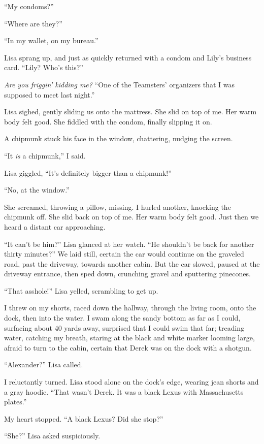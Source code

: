 ``My condoms?''

``Where are they?''

``In my wallet, on my bureau.''

Lisa sprang up, and just as quickly returned with a condom and Lily's
business card. ``Lily? Who's this?''

\emph{Are you friggin' kidding me?} ``One of the Teamsters' organizers
that I was supposed to meet last night.''

Lisa sighed, gently sliding us onto the mattress. She slid on top of me.
Her warm body felt good. She fiddled with the condom, finally slipping
it on.

A chipmunk stuck his face in the window, chattering, nudging the screen.

``It \emph{is} a chipmunk,'' I said.

Lisa giggled, ``It's definitely bigger than a chipmunk!''

``No, at the window.''

She screamed, throwing a pillow, missing. I hurled another, knocking the
chipmunk off. She slid back on top of me. Her warm body felt good. Just
then we heard a distant car approaching.

``It can't be him?'' Lisa glanced at her watch. ``He shouldn't be back
for another thirty minutes?'' We laid still, certain the car would
continue on the graveled road, past the driveway, towards another cabin.
But the car slowed, paused at the driveway entrance, then sped down,
crunching gravel and sputtering pinecones.

``That asshole!'' Lisa yelled, scrambling to get up.

I threw on my shorts, raced down the hallway, through the living room,
onto the dock, then into the water. I swam along the sandy bottom as far
as I could, surfacing about 40 yards away, surprised that I could swim
that far; treading water, catching my breath, staring at the black and
white marker looming large, afraid to turn to the cabin, certain that
Derek was on the dock with a shotgun.

``Alexander?'' Lisa called.

I reluctantly turned. Lisa stood alone on the dock's edge, wearing jean
shorts and a gray hoodie. ``That wasn't Derek. It was a black Lexus with
Massachusetts plates.''

My heart stopped. ``A black Lexus? Did she stop?''

``She?'' Lisa asked suspiciously.

